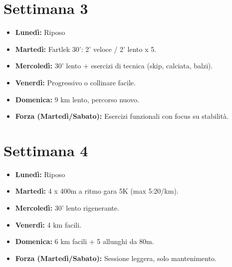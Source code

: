 \documentclass[a4paper, 11pt]{article}
\begin{document}
\vspace{1cm} %

\noindent %
\begin{minipage}[t]{0.48\textwidth} %
\section*{Settimana 3}
\begin{itemize}[leftmargin=*, labelsep=5.8mm, topsep=0pt, partopsep=0pt, itemsep=2pt, parsep=2pt]
    \item \textbf{Lunedì:} Riposo
    \item \textbf{Martedì:} Fartlek 30’: 2’ veloce / 2’ lento x 5.
    \item \textbf{Mercoledì:} 30’ lento + esercizi di tecnica (skip, calciata, balzi).
    \item \textbf{Venerdì:} Progressivo o collinare facile.
    \item \textbf{Domenica:} 9 km lento, percorso nuovo.
    \item \textbf{Forza (Martedì/Sabato):} Esercizi funzionali con focus su stabilità.
\end{itemize}
\end{minipage}\hfill %
\begin{minipage}[t]{0.48\textwidth} %
\section*{Settimana 4}
\begin{itemize}[leftmargin=*, labelsep=5.8mm, topsep=0pt, partopsep=0pt, itemsep=2pt, parsep=2pt]
    \item \textbf{Lunedì:} Riposo
    \item \textbf{Martedì:} 4 x 400m a ritmo gara 5K (max 5:20/km).
    \item \textbf{Mercoledì:} 30’ lento rigenerante.
    \item \textbf{Venerdì:} 4 km facili.
    \item \textbf{Domenica:} 6 km facili + 5 allunghi da 80m.
    \item \textbf{Forza (Martedì/Sabato):} Sessione leggera, solo mantenimento.
\end{itemize}
\end{minipage}
\end{document}
